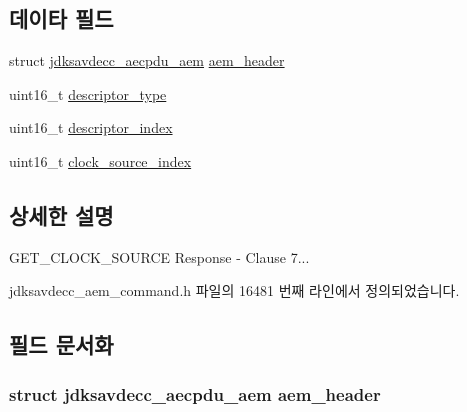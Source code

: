 \subsection*{데이타 필드}
\begin{DoxyCompactItemize}
\item 
struct \hyperlink{structjdksavdecc__aecpdu__aem}{jdksavdecc\+\_\+aecpdu\+\_\+aem} \hyperlink{structjdksavdecc__aem__command__get__clock__source__response_ae1e77ccb75ff5021ad923221eab38294}{aem\+\_\+header}
\item 
uint16\+\_\+t \hyperlink{structjdksavdecc__aem__command__get__clock__source__response_ab7c32b6c7131c13d4ea3b7ee2f09b78d}{descriptor\+\_\+type}
\item 
uint16\+\_\+t \hyperlink{structjdksavdecc__aem__command__get__clock__source__response_a042bbc76d835b82d27c1932431ee38d4}{descriptor\+\_\+index}
\item 
uint16\+\_\+t \hyperlink{structjdksavdecc__aem__command__get__clock__source__response_ae6d3717453951addecc331540f572e30}{clock\+\_\+source\+\_\+index}
\end{DoxyCompactItemize}


\subsection{상세한 설명}
G\+E\+T\+\_\+\+C\+L\+O\+C\+K\+\_\+\+S\+O\+U\+R\+CE Response -\/ Clause 7... 

jdksavdecc\+\_\+aem\+\_\+command.\+h 파일의 16481 번째 라인에서 정의되었습니다.



\subsection{필드 문서화}
\subsubsection[{\texorpdfstring{aem\+\_\+header}{aem_header}}]{\setlength{\rightskip}{0pt plus 5cm}struct {\bf jdksavdecc\+\_\+aecpdu\+\_\+aem} aem\+\_\+header}\hypertarget{structjdksavdecc__aem__command__get__clock__source__response_ae1e77ccb75ff5021ad923221eab38294}{}\label{structjdksavdecc__aem__command__get__clock__source__response_ae1e77ccb75ff5021ad923221eab38294}


